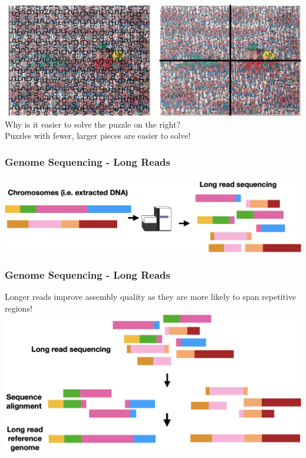 \documentclass{beamer}
\begin{document}
\begin{frame}
	\center		\includegraphics[width=\textwidth]{img/waldoBigpiece}\\
	Why is it easier to solve the puzzle on the right? \\
	\pause
	Puzzles with fewer, larger pieces are easier to solve!
\end{frame}


\begin{frame}
	\frametitle{Genome Sequencing - Long Reads}
	
	\includegraphics[width=\textwidth]{img/longReads}
\end{frame}


\begin{frame}
	\frametitle{Genome Sequencing - Long Reads}
	Longer reads improve assembly quality as they are more likely to span repetitive regions!
	\vspace{20pt}
	\includegraphics[width=\textwidth]{img/longReadAssembly}
\end{frame}
\end{document}
